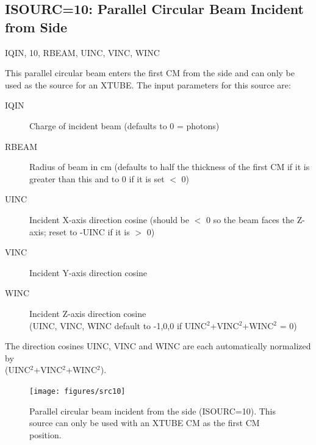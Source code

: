 \documentclass[12pt,twoside]{article}
\newcommand{\cen}[1]{\begin{center} #1 \end{center}                   }
\begin{document}
\clearpage

\subsection{ISOURC=10: Parallel Circular Beam Incident from Side}
\cen{IQIN, 10, RBEAM, UINC, VINC, WINC}
  

This parallel circular beam enters the first CM from the side and can only
be used as the source for an XTUBE.
The input parameters for this source are:
\begin{description}
\item [IQIN] Charge of incident beam (defaults to 0 = photons)
\item [RBEAM] Radius of beam in cm (defaults to half the thickness of the
first CM
if it is greater than this and to 0 if it is set $<$ 0)
\item [UINC] Incident X-axis direction cosine (should be $<$ 0 so the beam
faces the Z-axis; reset to -UINC if it is $>$ 0)
\item [VINC] Incident Y-axis direction cosine
\item [WINC] Incident Z-axis direction cosine\\
(UINC, VINC, WINC default to -1,0,0 if UINC$^2$+VINC$^2$+WINC$^2$ = 0)
\end{description}
The direction cosines UINC, VINC and WINC are each automatically
normalized by\\
(UINC$^2$+VINC$^2$+WINC$^2$).
\begin{figure}[htbp]
\begin{center}
\leavevmode
\mbox{}\hspace{0cm}
\texttt{[image: figures/src10]}
\caption[ISOURC=10: Circular beam for XTUBE.]
{Parallel circular beam incident from the side (ISOURC=10).
This source can only be used with an XTUBE CM as the first CM
position.}
\label{fig_src10}
\end{center}
\end{figure}

\clearpage
\end{document}
